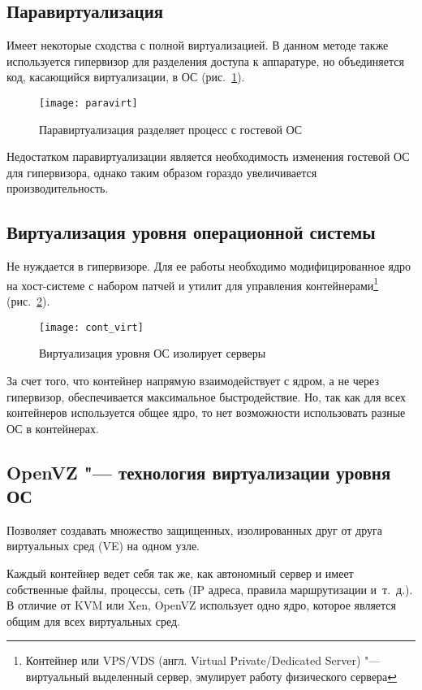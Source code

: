 \subsection{Паравиртуализация}
Имеет некоторые сходства с полной виртуализацией. 
В данном методе также используется гипервизор для разделения доступа к аппаратуре, но объединяется код, касающийся виртуализации, в ОС \cite{virtuallinux} (рис.~\ref{pic:paravirt}).
\begin{figure}[ht]
    \centering
	\texttt{[image: paravirt]}
	\caption{Паравиртуализация разделяет процесс с гостевой ОС}\label{pic:paravirt}
\end{figure}

Недостатком паравиртуализации является необходимость изменения гостевой ОС для гипервизора, однако таким образом гораздо увеличивается производительность.
 
\subsection{Виртуализация уровня операционной системы}
Не нуждается в гипервизоре. 
Для ее работы необходимо модифицированное ядро на хост-системе с набором патчей и утилит для управления контейнерами\footnote{Контейнер или VPS/VDS (англ. Virtual Private/Dedicated Server) "--- виртуальный выделенный сервер, эмулирует работу физического сервера} (рис.~\ref{pic:cont_virt}).
\begin{figure}[ht]
    \centering
	\texttt{[image: cont\_virt]}
	\caption{Виртуализация уровня ОС изолирует серверы}\label{pic:cont_virt}
\end{figure}

За счет того, что контейнер напрямую взаимодействует с ядром, а не через гипервизор, обеспечивается максимальное быстродействие. Но, так как для всех контейнеров используется общее ядро, то нет возможности использовать разные ОС в контейнерах.

\subsection{OpenVZ "--- технология виртуализации уровня ОС}
Позволяет создавать множество защищенных, изолированных друг от друга виртуальных сред (VE) на одном узле. 

Каждый контейнер ведет себя так же, как автономный сервер и имеет собственные файлы, процессы, сеть (IP адреса, правила маршрутизации и~т.~д.).
В отличие от KVM или Xen, OpenVZ использует одно ядро, которое является общим для всех виртуальных сред.

